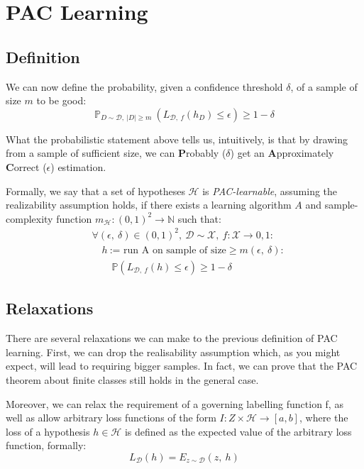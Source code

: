 \documentclass[11pt]{sigplanconf}
\renewcommand\it{\textit}
\renewcommand\bf{\textbf}
\renewcommand\H{\mathcal{H}}
\newcommand\D{\mathcal{D}}
\newcommand\X{\mathcal{X}}
\renewcommand\P{\mathds{P}}
\newcommand\N{\mathds{N}}
\begin{document}
\section{PAC Learning}

\subsection{Definition}
We can now define the probability, given a confidence threshold $\delta$, of a sample of size $m$ to be good:
\[ \P_{D \sim \D,\ |D|\geq m}\ (L_{\D,\ f}(h_D) \leq \epsilon) \geq 1 - \delta
\]

What the probabilistic statement above tells us, intuitively, is that by drawing from a sample of sufficient size, we can \bf{P}robably ($\delta$) get an \bf{A}pproximately \bf{C}orrect ($\epsilon$) estimation.

Formally, we say that a set of hypotheses $\H$ is \it{PAC-learnable}, assuming the realizability assumption holds,  if there exists a learning algorithm $A$ and sample-complexity function $m_{\H}:(0,1)^2 \to \N$ such that:
\begin{align*}
&\forall (\epsilon,\ \delta)\in(0,1)^2,\ \D \sim \X,\ f:\X\to{0,1}: \\
&\quad h \ \text{:= run A on sample of size} \geq m(\epsilon,\ \delta): \\
&\quad \quad \P(L_{\D,\ f}(h) \leq \epsilon) \geq 1 - \delta
\end{align*} 

\subsection{Relaxations}
There are several relaxations we can make to the previous definition of PAC learning. First, we can drop the realisability assumption which, as you might expect, will lead to requiring bigger samples.
In fact, we can prove that the PAC theorem about finite classes still holds in the general case.

Moreover, we can relax the requirement of a governing labelling function f, as well as allow arbitrary loss functions of the form $I:Z\times\H\to[a, b]$, where the loss of a hypothesis $h \in \H$ is defined as the expected value of the arbitrary loss function, formally:
\[ L_{\D}(h)=E_{z \sim \D}(z,\ h)
\] 
\end{document}
